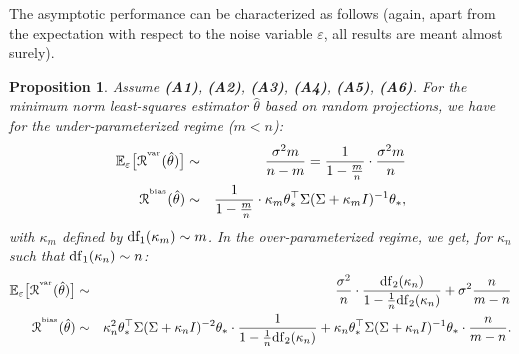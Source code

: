 \documentclass[11pt]{article}
\newcommand{\BEAS}{\begin{eqnarray*}}
\newcommand{\EEAS}{\end{eqnarray*}}
\newcommand{\idm}{I}
\newtheorem{proposition}{Proposition}
\def \S{  { \Sigma} }
\def \E{{\mathbb E}}
\begin{document}
The asymptotic performance can be characterized as follows (again, apart from the expectation with respect to the noise variable $\varepsilon$, all results are meant almost surely).

\begin{proposition}
Assume \textbf{(A1)}, \textbf{(A2)},  \textbf{(A3)}, \textbf{(A4)}, \textbf{(A5)},  \textbf{(A6)}. For the minimum norm least-squares estimator $\hat{\theta}$ based on random projections, we have for the under-parameterized regime ($m<n$):
\BEAS
\E_\varepsilon \big[ \mathcal{R}^{^{\rm var}} (\hat{\theta})\big]
& \sim &  \frac{\sigma^2 m}{n-m} = \frac{1}{1 - \frac{m}{n}}  \cdot \frac{\sigma^2 m}{n}  
\\ 
\mathcal{R}^{^{\rm bias}} (\hat{\theta})  
& \sim & \frac{1}{1 - \frac{m}{n}} \cdot \kappa_m \theta_\ast^\top \S ( \S + \kappa_m \idm)^{-1} \theta_\ast,
\EEAS
 with $\kappa_m$ defined by   ${\rm df_1}(\kappa_m) \sim m$. In the over-parameterized regime, 
  we get, for  $\kappa_n$ such that ${\rm df}_1(\kappa_n) \sim n$:
  \BEAS
\E_\varepsilon \big[ \mathcal{R}^{^{\rm var}} (\hat{\theta}) \big]
& \sim & \frac{\sigma^2}{n} \cdot \frac{ {\rm df}_2(\kappa_n)   }{1  -  \frac{1}{n}{\rm df}_2(\kappa_n) }
+  \sigma^2 \frac{n}{m-n}   
\\
 \mathcal{R}^{^{\rm bias}} (\hat{\theta}) 
& \sim & \kappa_n^2 \theta_\ast^\top \S (  \S + \kappa_n \idm)^{-2} \theta_\ast \cdot 
 \frac{ 1 }{ 1 - \frac{1}{n} {\rm df}_2(\kappa_n)}
 + \kappa_n \theta_\ast^\top \S ( \S+ \kappa_n\idm)^{-1} \theta_\ast \cdot \frac{n}{m-n} .
\EEAS
\end{proposition}
\end{document}

